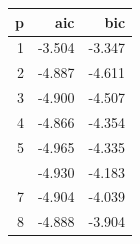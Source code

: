 
\begin{tabular}{rrr}
\toprule
p & aic & bic\\
\midrule
1 & -3.504 & -3.347\\
2 & -4.887 & -4.611\\
3 & -4.900 & -4.507\\
4 & -4.866 & -4.354\\
5 & -4.965 & -4.335\\
\addlinespace
6 & -4.930 & -4.183\\
7 & -4.904 & -4.039\\
8 & -4.888 & -3.904\\
\bottomrule
\end{tabular}
